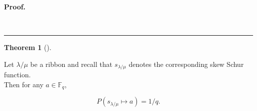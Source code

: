 \documentclass[numbers=enddot,12pt,final,onecolumn,notitlepage]{scrartcl}%
\theoremstyle{definition}
\newtheorem{theo}{Theorem}[section]
\newenvironment{theorem}[1][]
{\begin{theo}[#1]\begin{leftbar}}
{\end{leftbar}\end{theo}}
\newenvironment{proof}[1][Proof]{\noindent\textbf{#1.} }{\ \rule{0.5em}{0.5em}}
\renewcommand{\leq}{\leqslant}
\renewcommand{\geq}{\geqslant}
\theoremstyle{plainsl}
\begin{document}
\begin{proof}








\end{proof}




\begin{theorem}
\label{thm.ribbon}

Let $\lambda/\mu$ be a ribbon and recall that $s_{\lambda/\mu}$ denotes the corresponding skew Schur function. \\

Then for any $a\in \mathbb{F}_{q}$,

\[P(s_{\lambda/\mu} \longmapsto a) = 1/q. \]
\end{theorem}
\end{document}
